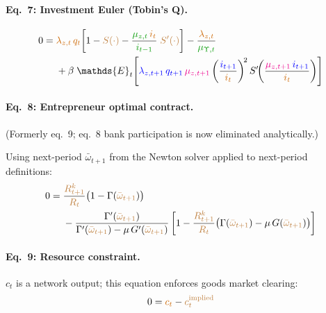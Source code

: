 \documentclass[11pt]{article}
\begin{document}
\paragraph{Eq.~7: Investment Euler (Tobin's Q).}
\begin{equation}
  \begin{split}
  0 = {}&
    \textcolor{orange!80!black}{\lambda_{z,t}}\,\textcolor{orange!80!black}{q_t}\!\left[
      1 - \textcolor{brown}{S(\cdot)}
      - \frac{\textcolor{green!60!black}{\mu_{z,t}}\,\textcolor{orange!80!black}{i_t}}
        {\textcolor{green!60!black}{i_{t-1}}}\;\textcolor{brown}{S'(\cdot)}
    \right]
    - \frac{\textcolor{orange!80!black}{\lambda_{z,t}}}{\textcolor{green!60!black}{\mu_{\Upsilon,t}}}
  \\
    &+ \beta\;\mathds{E}_t\!\left[
      \textcolor{blue}{\lambda_{z,t+1}}\,\textcolor{blue}{q_{t+1}}\,\textcolor{magenta}{\mu_{z,t+1}}
      \left(\frac{\textcolor{blue}{i_{t+1}}}{\textcolor{orange!80!black}{i_t}}\right)^{\!2}
      S'\!\!\left(\frac{\textcolor{magenta}{\mu_{z,t+1}}\,\textcolor{blue}{i_{t+1}}}
        {\textcolor{orange!80!black}{i_t}}\right)
    \right]
  \end{split}
\end{equation}

\paragraph{Eq.~8: Entrepreneur optimal contract.}
(Formerly eq.~9; eq.~8 bank participation is now eliminated analytically.)

Using next-period $\bar\omega_{t+1}$ from the Newton solver applied to next-period definitions:
\begin{equation}
  \begin{split}
  0 ={}&
    \frac{\textcolor{brown}{R_{t+1}^k}}{\textcolor{brown}{R_t}}
    \bigl(1 - \Gamma(\textcolor{brown}{\bar\omega_{t+1}})\bigr)
  \\
    &-\frac{\Gamma'(\textcolor{brown}{\bar\omega_{t+1}})}
      {\Gamma'(\textcolor{brown}{\bar\omega_{t+1}}) - \mu\,G'(\textcolor{brown}{\bar\omega_{t+1}})}
    \left[
      1 - \frac{\textcolor{brown}{R_{t+1}^k}}{\textcolor{brown}{R_t}}
      \bigl(\Gamma(\textcolor{brown}{\bar\omega_{t+1}}) - \mu\,G(\textcolor{brown}{\bar\omega_{t+1}})\bigr)
    \right]
  \end{split}
\end{equation}

\paragraph{Eq.~9: Resource constraint.}
$c_t$ is a network output; this equation enforces goods market clearing:
\begin{equation}
  0 = \textcolor{orange!80!black}{c_t} - \textcolor{brown}{c_t^{\text{implied}}}
\end{equation}
\end{document}
